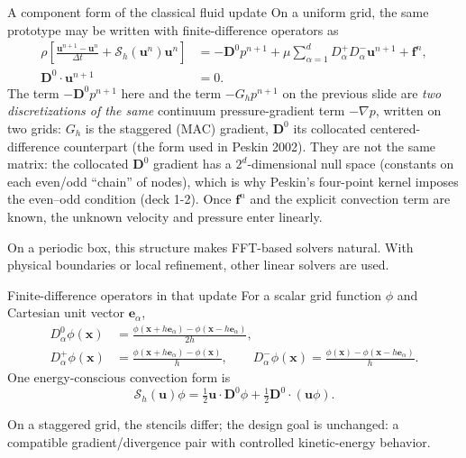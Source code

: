 \documentclass[aspectratio=169,11pt]{beamer}
\newcommand{\uvec}{\bm{u}}
\newcommand{\xvec}{\bm{x}}
\newcommand{\fvec}{\bm{f}}
\begin{document}
\begin{frame}{A component form of the classical fluid update}
\small
On a uniform grid, the same prototype may be written with finite-difference operators as
\begin{align*}
 \rho\left[
   \frac{\uvec^{n+1}-\uvec^n}{\Delta t}
   +\mathcal S_h(\uvec^n)\uvec^n
 \right]
 &=-\bm D^{0}p^{n+1}
   +\mu\sum_{\alpha=1}^{d}D_\alpha^+D_\alpha^-\uvec^{n+1}
   +\fvec^n,\\
 \bm D^{0}\!\cdot\uvec^{n+1}&=0.
\end{align*}
The term $-\bm D^{0}p^{n+1}$ here and the term $-G_hp^{n+1}$ on the previous slide are \emph{two discretizations of the same} continuum pressure-gradient term $-\nabla p$, written on two grids: $G_h$ is the staggered (MAC) gradient, $\bm D^{0}$ its collocated centered-difference counterpart (the form used in Peskin 2002). They are not the same matrix: the collocated $\bm D^{0}$ gradient has a $2^d$-dimensional null space (constants on each even/odd ``chain'' of nodes), which is why Peskin's four-point kernel imposes the even--odd condition (deck 1-2).
Once $\fvec^n$ and the explicit convection term are known, the unknown velocity and pressure enter linearly.
\begin{punchbox}
On a periodic box, this structure makes FFT-based solvers natural. With physical boundaries or local refinement, other linear solvers are used.
\end{punchbox}
\end{frame}

\begin{frame}{Finite-difference operators in that update}
\small
For a scalar grid function $\phi$ and Cartesian unit vector $\bm e_\alpha$,
\begin{align*}
 D_\alpha^0\phi(\xvec)
 &=\frac{\phi(\xvec+h\bm e_\alpha)-\phi(\xvec-h\bm e_\alpha)}{2h},\\
 D_\alpha^+\phi(\xvec)
 &=\frac{\phi(\xvec+h\bm e_\alpha)-\phi(\xvec)}{h},\qquad
 D_\alpha^-\phi(\xvec)
 =\frac{\phi(\xvec)-\phi(\xvec-h\bm e_\alpha)}{h}.
\end{align*}
One energy-conscious convection form is
\[
 \mathcal S_h(\uvec)\phi
 =\tfrac12\uvec\cdot\bm D^0\phi
 +\tfrac12\bm D^0\!\cdot(\uvec\phi).
\]
\begin{punchbox}
On a staggered grid, the stencils differ; the design goal is unchanged: a compatible gradient/divergence pair with controlled kinetic-energy behavior.
\end{punchbox}
\end{frame}
\end{document}
